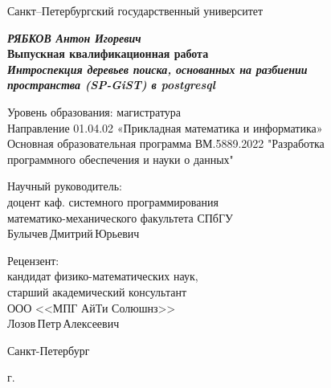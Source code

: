\documentclass[12pt,oneside]{amsart}
\begin{document}
%
%
\begin{titlepage}
\begin{center}

Санкт--Петербургский государственный университет\\


\vspace{35mm}

\textbf{\textit{\large РЯБКОВ Антон Игоревич}} \\[8mm]
\textbf{\large Выпускная квалификационная работа}\\[3mm]
\textbf{\textit{\large Интроспекция деревьев поиска, основанных на разбиении \\ пространства (SP-GiST) в postgresql}}

\vspace{20mm}
Уровень образования: магистратура\\
Направление 01.04.02 «Прикладная математика и информатика»\\
Основная образовательная программа ВМ.5889.2022 "Разработка \\ программного обеспечения и науки о данных"
\\[25mm]


\begin{flushright}
\begin{minipage}[t]{0.65\textwidth}
{Научный руководитель:} \\
доцент каф. системного программирования \\ математико-механического факультета СПбГУ \\
Булычев\,Дмитрий\,Юрьевич
\vspace{10mm}

{Рецензент:} \\
кандидат физико-математических наук, \\ старший академический консультант \\ ООО <<МПГ АйТи Солюшнз>> \\ Лозов\,Петр\,Алексеевич
\end{minipage}
\end{flushright}

\vfill

{Санкт-Петербург}
\par{\the\year{} г.}
\end{center}
\end{titlepage}
\restoregeometry
\addtocounter{page}{1}
\end{document}
